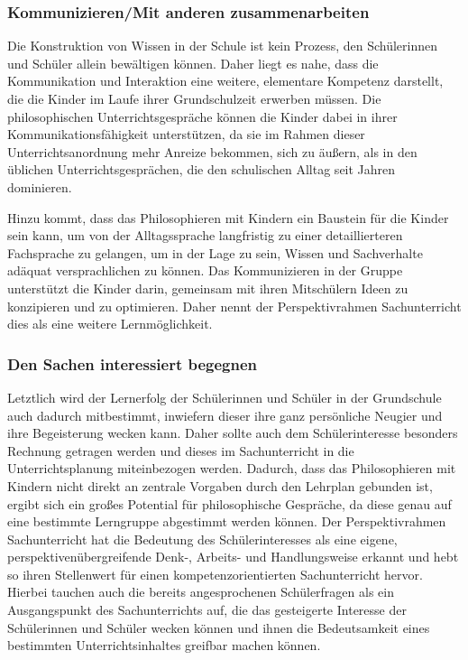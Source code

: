 \subsubsection{Kommunizieren/Mit anderen zusammenarbeiten}


Die Konstruktion von Wissen in der Schule ist kein Prozess, den Schülerinnen und Schüler allein bewältigen können. 
Daher liegt es nahe, dass die Kommunikation und Interaktion eine weitere, elementare Kompetenz darstellt, die die Kinder im Laufe ihrer Grundschulzeit erwerben müssen.
 Die philosophischen Unterrichtsgespräche können die Kinder dabei in ihrer Kommunikationsfähigkeit unterstützen, da sie im Rahmen dieser Unterrichtsanordnung mehr Anreize bekommen, sich zu äußern, als in den üblichen Unterrichtsgesprächen, die den schulischen Alltag seit Jahren dominieren.

Hinzu kommt, dass das Philosophieren mit Kindern ein Baustein für die Kinder sein kann, um von der Alltagssprache langfristig zu einer detaillierteren Fachsprache zu gelangen, um in der Lage zu sein, Wissen und Sachverhalte adäquat versprachlichen zu können\cite[S.\,24]{GDS13}.
Das Kommunizieren in der Gruppe unterstützt die Kinder darin, gemeinsam mit ihren Mitschülern Ideen zu konzipieren und zu optimieren. Daher nennt der Perspektivrahmen Sachunterricht dies als eine weitere Lernmöglichkeit.

\subsubsection{Den Sachen interessiert begegnen}


Letztlich wird der Lernerfolg der Schülerinnen und Schüler in der Grundschule auch dadurch mitbestimmt, inwiefern dieser ihre ganz persönliche Neugier und ihre Begeisterung wecken kann. 
Daher sollte auch dem Schülerinteresse besonders Rechnung getragen werden und dieses im Sachunterricht in die Unterrichtsplanung miteinbezogen werden.
 Dadurch, dass das Philosophieren mit Kindern nicht direkt an zentrale Vorgaben durch den Lehrplan gebunden ist, ergibt sich ein großes Potential für philosophische Gespräche, da diese genau auf eine bestimmte Lerngruppe abgestimmt werden können. 
Der Perspektivrahmen Sachunterricht hat die Bedeutung des Schülerinteresses als eine eigene, perspektivenübergreifende Denk-, Arbeits- und Handlungsweise erkannt und hebt so ihren Stellenwert für einen kompetenzorientierten Sachunterricht hervor. 
Hierbei tauchen auch die bereits angesprochenen Schülerfragen als ein Ausgangspunkt des Sachunterrichts auf, die das gesteigerte Interesse der Schülerinnen und Schüler wecken können und ihnen die Bedeutsamkeit eines bestimmten Unterrichtsinhaltes greifbar machen können. 

